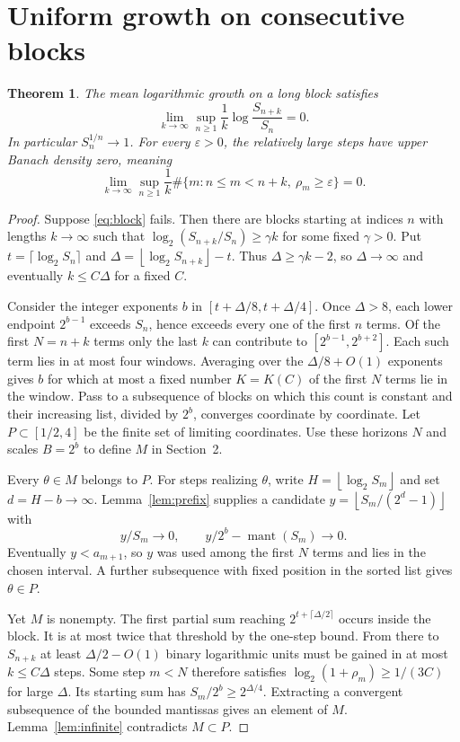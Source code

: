 \documentclass[11pt]{article}
\newtheorem{theorem}{Theorem}[section]
\newcommand{\fl}[1]{\left\lfloor#1\right\rfloor}
\newcommand{\mant}{\operatorname{mant}}
\begin{document}
\section{Uniform growth on consecutive blocks}
\begin{theorem}\label{th:growth}
The mean logarithmic growth on a long block satisfies
\begin{equation}\label{eq:block}
 \lim_{k\to\infty}\sup_{n\ge1}\frac1k\log\frac{S_{n+k}}{S_n}=0 .
\end{equation}
In particular $S_n^{1/n}\to1$. For every $\varepsilon>0$, the relatively large steps have upper Banach density zero, meaning
\[
 \lim_{k\to\infty}\sup_{n\ge1}
 \frac1k\#\{m:n\le m<n+k,\ \rho_m\ge\varepsilon\}=0 .
\]
\end{theorem}
\begin{proof}
Suppose \eqref{eq:block} fails. Then there are blocks starting at indices $n$ with lengths $k\to\infty$ such that $\log_2(S_{n+k}/S_n)\ge\gamma k$ for some fixed $\gamma>0$. Put $t=\lceil\log_2 S_n\rceil$ and $\Delta=\fl{\log_2 S_{n+k}}-t$. Thus $\Delta\ge\gamma k-2$, so $\Delta\to\infty$ and eventually $k\le C\Delta$ for a fixed $C$.

Consider the integer exponents $b$ in $[t+\Delta/8,t+\Delta/4]$. Once $\Delta>8$, each lower endpoint $2^{b-1}$ exceeds $S_n$, hence exceeds every one of the first $n$ terms. Of the first $N=n+k$ terms only the last $k$ can contribute to $[2^{b-1},2^{b+2}]$. Each such term lies in at most four windows. Averaging over the $\Delta/8+O(1)$ exponents gives $b$ for which at most a fixed number $K=K(C)$ of the first $N$ terms lie in the window. Pass to a subsequence of blocks on which this count is constant and their increasing list, divided by $2^b$, converges coordinate by coordinate. Let $P\subset[1/2,4]$ be the finite set of limiting coordinates. Use these horizons $N$ and scales $B=2^b$ to define $M$ in Section~2.

Every $\theta\in M$ belongs to $P$. For steps realizing $\theta$, write $H=\fl{\log_2 S_m}$ and set $d=H-b\to\infty$. Lemma~\ref{lem:prefix} supplies a candidate $y=\fl{S_m/(2^d-1)}$ with
\[
 y/S_m\to0,\qquad y/2^b-\mant(S_m)\to0.
\]
Eventually $y<a_{m+1}$, so $y$ was used among the first $N$ terms and lies in the chosen interval. A further subsequence with fixed position in the sorted list gives $\theta\in P$.

Yet $M$ is nonempty. The first partial sum reaching $2^{t+\lceil\Delta/2\rceil}$ occurs inside the block. It is at most twice that threshold by the one-step bound. From there to $S_{n+k}$ at least $\Delta/2-O(1)$ binary logarithmic units must be gained in at most $k\le C\Delta$ steps. Some step $m<N$ therefore satisfies $\log_2(1+\rho_m)\ge1/(3C)$ for large $\Delta$. Its starting sum has $S_m/2^b\ge 2^{\Delta/4}$. Extracting a convergent subsequence of the bounded mantissas gives an element of $M$. Lemma~\ref{lem:infinite} contradicts $M\subset P$.


\end{proof}
\end{document}
